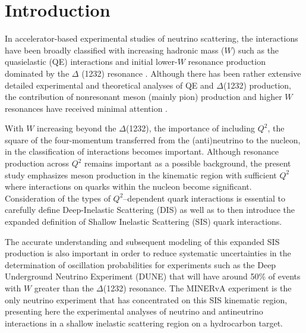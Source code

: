 \documentclass[aps, prd, twocolumn, showpacs, superscriptaddress, floatfix]{revtex4-2}
\begin{document}
\section{Introduction}
In accelerator-based experimental studies of neutrino scattering, the interactions have been broadly classified with increasing hadronic mass ($W$) such as the quasielastic (QE) interactions \cite{Sobczyk:2011bi} and initial lower-$W$ resonance production dominated by the $\Delta$ (1232) resonance \cite{Paschos:2012va}. Although there has been rather extensive detailed experimental and theoretical \cite{AlvarezRuso2018} analyses of QE and $\Delta$(1232) production, the contribution of nonresonant meson (mainly pion) production and higher $W$ resonances have received minimal attention \cite{Sajjad2020}. 
  
With $W$ increasing beyond the $\Delta$(1232), the importance of including $Q^2$, the square of the four-momentum transferred from the (anti)neutrino to the nucleon, in the classification of interactions becomes important. Although resonance production across $Q^2$ remains important as a possible background, the present study emphasizes meson production in the kinematic region with sufficient $Q^2$ where interactions on quarks within the nucleon become significant. Consideration of the types of $Q^2$–dependent quark interactions is essential to carefully define Deep-Inelastic Scattering (DIS) as well as to then introduce the expanded definition of Shallow Inelastic Scattering (SIS) quark interactions.
  
The accurate understanding and subsequent modeling of this expanded SIS production is also important in order to reduce systematic uncertainties in the determination of oscillation probabilities for experiments such as the Deep Underground Neutrino Experiment (DUNE) \cite{DUNE2015} that will have around 50\% of events with $W$ greater than the $\Delta$(1232) resonance. The MINERvA experiment is the only neutrino experiment that has concentrated on this SIS kinematic region, presenting here the experimental analyses of neutrino and antineutrino interactions in a shallow inelastic scattering region on a hydrocarbon target.
\end{document}
